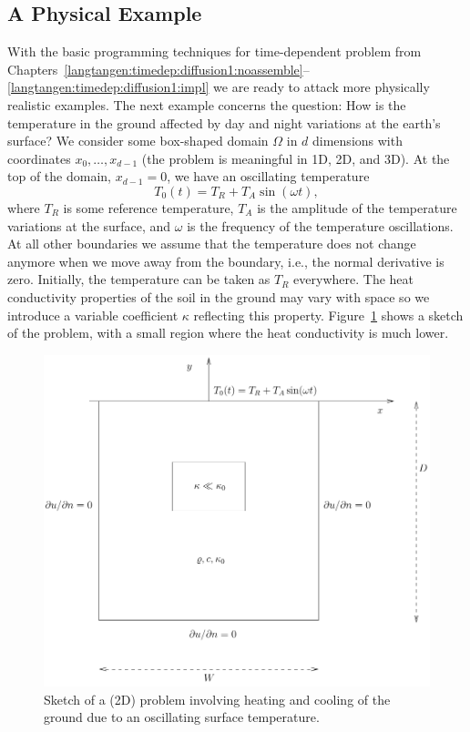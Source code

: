 \subsection{A Physical Example}
\label{langtangen:timedep:diffusion2:sin}

With the basic programming techniques for time-dependent problem from
Chapters~\ref{langtangen:timedep:diffusion1:noassemble}--\ref{langtangen:timedep:diffusion1:impl}
we are ready to attack more physically realistic examples.
The next example concerns the question: How is the temperature in the
ground affected by day and night variations at the earth's surface?
We consider some box-shaped domain $\Omega$ in $d$ dimensions with
coordinates $x_0,\ldots,x_{d-1}$ (the problem is meaningful in 1D, 2D, and 3D).
At the top of the domain, $x_{d-1}=0$, we have an oscillating
temperature
\[ T_0(t) = T_R + T_A\sin (\omega t),\]
where $T_R$ is some reference temperature, $T_A$ is the amplitude of
the temperature variations at the surface, and $\omega$ is the frequency
of the temperature oscillations.
At all other boundaries we assume
that the temperature does not change anymore when we move away from
the boundary, i.e., the normal derivative is zero.
Initially, the temperature can be taken as $T_R$ everywhere.
The heat conductivity properties of the soil in the
ground may vary with space so
we introduce a variable coefficient $\kappa$ reflecting this property.
Figure~\ref{langtangen:timedep:diffusion2:sin:fig1} shows a sketch of the
problem, with a small region where the heat conductivity is much lower.
\begin{figure}
  \begin{center}
    \centerline{
      \includegraphics[width=0.8\linewidth]{chapters/langtangen/pdf/daynight.pdf}
    }
    \caption{
      Sketch of a (2D) problem involving heating and cooling of the ground due
      to an oscillating surface temperature.
    }
    \label{langtangen:timedep:diffusion2:sin:fig1}
  \end{center}
\end{figure}

